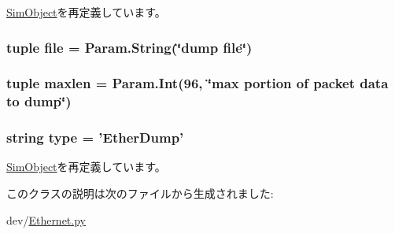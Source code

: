 \hyperlink{classm5_1_1SimObject_1_1SimObject_a17da7064bc5c518791f0c891eff05fda}{SimObject}を再定義しています。\hypertarget{classEthernet_1_1EtherDump_a8c17a4dfad23c7a5de93a438838a4e90}{
\subsubsection[{file}]{\setlength{\rightskip}{0pt plus 5cm}tuple {\bf file} = Param.String(\char`\"{}dump {\bf file}\char`\"{})}}
\label{classEthernet_1_1EtherDump_a8c17a4dfad23c7a5de93a438838a4e90}
\hypertarget{classEthernet_1_1EtherDump_acf39e345ad6bd1dec0be19540d7da527}{
\subsubsection[{maxlen}]{\setlength{\rightskip}{0pt plus 5cm}tuple {\bf maxlen} = Param.Int(96, \char`\"{}max portion of packet data to dump\char`\"{})}}
\label{classEthernet_1_1EtherDump_acf39e345ad6bd1dec0be19540d7da527}
\hypertarget{classEthernet_1_1EtherDump_acce15679d830831b0bbe8ebc2a60b2ca}{
\subsubsection[{type}]{\setlength{\rightskip}{0pt plus 5cm}string {\bf type} = '{\bf EtherDump}'}}
\label{classEthernet_1_1EtherDump_acce15679d830831b0bbe8ebc2a60b2ca}


\hyperlink{classm5_1_1SimObject_1_1SimObject_acce15679d830831b0bbe8ebc2a60b2ca}{SimObject}を再定義しています。

このクラスの説明は次のファイルから生成されました:\begin{DoxyCompactItemize}
\item 
dev/\hyperlink{Ethernet_8py}{Ethernet.py}\end{DoxyCompactItemize}
